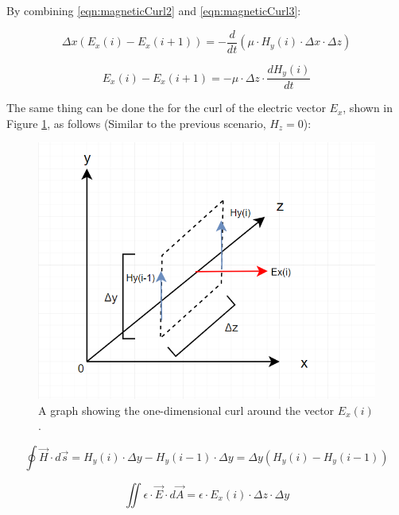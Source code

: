 By combining \ref{eqn:magneticCurl2} and \ref{eqn:magneticCurl3}:

\begin{equation}
	\label{eqn:magneticCurl4}
	\Delta x(E_x(i) - E_x(i+1)) = -\frac{d}{dt} (\mu \cdot H_y(i) \cdot \Delta x \cdot \Delta z)
\end{equation}

\begin{equation}
	\label{eqn:magneticCurl5}
	E_x(i) - E_x(i+1) = -\mu \cdot \Delta z \cdot \frac{dH_y(i)}{dt}
\end{equation}

The  same thing can be done the for the curl of the electric vector $E_x$, shown in Figure \ref{fig:fdtd1dEcurl}, as follows (Similar to the previous scenario, $H_z = 0$):

\begin{figure}
	\centering
	\includegraphics[scale=0.7]{Figures/fdtd1dEcurl}
	\decoRule
	\caption[1D Curl around $E_x$]{A graph showing the one-dimensional curl around the vector $E_x(i)$.}
	\label{fig:fdtd1dEcurl}
\end{figure}

\begin{equation}
	\label{eqn:electricCurl1}
	\oint \vec{H} \cdot d\vec{s} = H_y(i) \cdot \Delta y - H_y(i-1) \cdot \Delta y = \Delta y (H_y(i) - H_y(i-1))
\end{equation}

\begin{equation}
	\label{eqn:electricCurl2}
	\iint \epsilon \cdot \vec{E} \cdot d\vec{A} = \epsilon \cdot E_x(i) \cdot \Delta z \cdot \Delta y
\end{equation}

